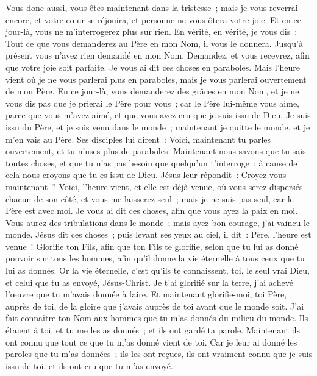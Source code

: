 \begin{multicols}{2}
Vous donc aussi, vous êtes maintenant dans la tristesse~; mais je vous reverrai encore, et votre cœur se réjouira, et personne ne vous ôtera votre joie.
Et en ce jour-là, vous ne m'interrogerez plus sur rien. En vérité, en vérité, je vous dis~: Tout ce que vous demanderez au Père en mon Nom, il vous le donnera.
Jusqu'à présent vous n'avez rien demandé en mon Nom. Demandez, et vous recevrez, afin que votre joie soit parfaite.
Je vous ai dit ces choses en paraboles. Mais l'heure vient où je ne vous parlerai plus en paraboles, mais je vous parlerai ouvertement de mon Père.
En ce jour-là, vous demanderez des grâces en mon Nom, et je ne vous dis pas que je prierai le Père pour vous~;
car le Père lui-même vous aime, parce que vous m'avez aimé, et que vous avez cru que je suis issu de Dieu.
Je suis issu du Père, et je suis venu dans le monde~; maintenant je quitte le monde, et je m'en vais au Père.
Ses disciples lui dirent~: Voici, maintenant tu parles ouvertement, et tu n'uses plus de paraboles.
Maintenant nous savons que tu sais toutes choses, et que tu n'as pas besoin que quelqu'un t'interroge~; à cause de cela nous croyons que tu es issu de Dieu.
Jésus leur répondit~: Croyez-vous maintenant~?
Voici, l'heure vient, et elle est déjà venue, où vous serez dispersés chacun de son côté, et vous me laisserez seul~; mais je ne suis pas seul, car le Père est avec moi.
Je vous ai dit ces choses, afin que vous ayez la paix en moi. Vous aurez des tribulations dans le monde~; mais ayez bon courage, j'ai vaincu le monde.
\VerseOne{}Jésus dit ces choses~; puis levant ses yeux au ciel, il dit~: Père, l'heure est venue~! Glorifie ton Fils, afin que ton Fils te glorifie,
selon que tu lui as donné pouvoir sur tous les hommes, afin qu'il donne la vie éternelle à tous ceux que tu lui as donnés.
Or la vie éternelle, c'est qu'ils te connaissent, toi, le seul vrai Dieu, et celui que tu as envoyé, Jésus-Christ.
Je t'ai glorifié sur la terre, j'ai achevé l'œuvre que tu m'avais donnée à faire.
Et maintenant glorifie-moi, toi Père, auprès de toi, de la gloire que j'avais auprès de toi avant que le monde soit.
J'ai fait connaître ton Nom aux hommes que tu m'as donnés du milieu du monde. Ils étaient à toi, et tu me les as donnés~; et ils ont gardé ta parole.
Maintenant ils ont connu que tout ce que tu m'as donné vient de toi.
Car je leur ai donné les paroles que tu m'as données~; ils les ont reçues, ils ont vraiment connu que je suis issu de toi, et ils ont cru que tu m'as envoyé.

\end{multicols}
